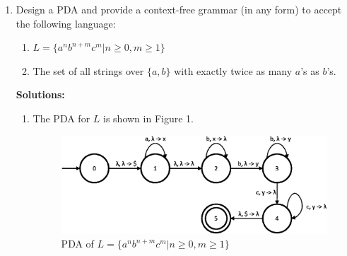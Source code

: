 \documentclass{article}%
\newenvironment{proof}[1][Proof]{\textbf{#1.} }{\ \rule{0.5em}{0.5em}}
\begin{document}
\begin{enumerate}
\begin{enumerate}
\begin{proof}
  2. $\forall u,v,x,y,z, s = uvxyz = , s.t. |vy| \geq 1$ and $|vxy| \leq p$.
  
  3. There is only one case for $v$ and $y$: $|vy|=m, 1 \leq m \leq p$. In this way, $s = 0^{7(x)^2 + (i - 1)m}$.
  
  4. Choose $i = (1 + \frac{2x^2}{m})$. By 2, $1 \leq m \leq p$. Thus, $m$ can be expressed as the products of some primes that are less or equal than $p$. Since $x$ is the product of all the primes that are less or equal to $p$, $x$ contains all the prime factors of $m$. Thus, $2x^2$ is the multiple of $m$ and  $i = (1 + \frac{2x^2}{m})$ is a natural number. In this way, $s = 0^{7(x)^2 + (\frac{2x^2}{m})m}$. The number of 0s is $7(x)^2 + (\frac{2x^2}{m})m = 7(x)^2 + 2x^2 = 9x^2 = (3x)^2$, which is a perfect square. Thus, $s \notin \bar{L}$ and $\bar{L}$ is not context-free.
  
	
	\end{proof}
	
	
\end{enumerate}

	\item Design a PDA and provide a context-free grammar (in any form) to accept the following language: 
	\begin{enumerate}
	\item $L = \{ a^n b^{n + m} c^m |n \ge 0,m \ge 1\} $
	\item The set of all strings over $\{a, b\}$ with exactly twice as many $a$'s as $b$'s.
	\end{enumerate}
	
\textbf{Solutions:}\\
	
\begin{enumerate}
	\item 
	The PDA for $L$ is shown in Figure 1.
	
	
\begin{figure}[h]
	\centering
		\includegraphics[scale=0.8]{1.eps}
		\caption{PDA of $L = \{ a^n b^{n + m} c^m |n \ge 0,m \ge 1\} $}
	\label{fig:1}
\end{figure}


\end{enumerate}
\end{enumerate}
\end{document}
